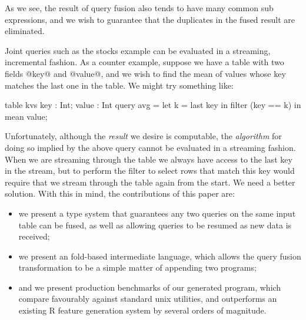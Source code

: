 As we see, the result of query fusion also tends to have many common sub expressions, and we wish to guarantee that the duplicates in the fused result are eliminated.

Joint queries such as the stocks example can be evaluated in a streaming, incremental fashion. As a counter example, suppose we have a table with two fields @key@ and @value@, and we wish to find the mean of values whose key matches the last one in the table. We might try something like:
%
\begin{code}
  table kvs { key : Int; value : Int }
  query avg = let k = last key
              in  filter (key == k) in mean value;
\end{code}

Unfortunately, although the \emph{result} we desire is computable, the \emph{algorithm} for doing so implied by the above query cannot be evaluated in a streaming fashion. When we are streaming through the table we always have access to the last key in the stream, but to perform the filter to select rows that match this key would require that we stream through the table again from the start. We need a better solution. With this in mind, the contributions of this paper are:
\begin{itemize}
\item
we present a type system that guarantees any two queries on the same input table can be fused, as well as allowing queries to be resumed as new data is received;

\item
we present an fold-based intermediate language, which allows the query fusion transformation to be a simple matter of appending two programs;

\item
and we present production benchmarks of our generated program, which compare favourably against standard unix utilities, and outperforms an existing R feature generation system by several orders of magnitude.
\end{itemize}




